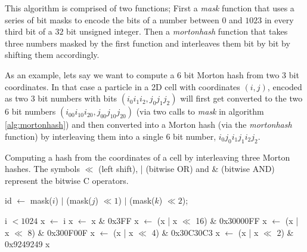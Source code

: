 \documentclass[ twoside,openright,titlepage,numbers=noenddot,%
headinclude,footinclude,cleardoublepage=empty,abstract=on,
BCOR=5mm,paper=a4,fontsize=11pt, dvipsnames
]{scrreprt}
\begin{document}
This algorithm is comprised of two functions; First a \emph{mask} function that uses a series of bit masks to encode the bits of a number between $0$ and $1023$ in every third bit of a $32$ bit unsigned integer. Then a \emph{mortonhash} function that takes three numbers masked by the first function and interleaves them bit by bit by shifting them accordingly.

As an example, lets say we want to compute a $6$ bit Morton hash from two $3$ bit coordinates. In that case a particle in a 2D cell with coordinates $(i,j)$, encoded as two $3$ bit numbers with bits $(i_0i_1i_2, j_0j_1j_2)$ will first get converted to the two $6$ bit numbers $(i_00i_10i_20, j_00j_10j_20)$ (via two calls to \emph{mask} in algorithm \ref{alg:mortonhash}) and then converted into a Morton hash (via the \emph{mortonhash} function) by interleaving them into a single $6$ bit number, $i_0j_0i_1j_1i_2j_2$.

\begin{algorithm}
  \caption{Computing a hash from the coordinates of a cell by interleaving three Morton hashes. The symbols $\ll$ (left shift), | (bitwise OR) and \& (bitwise AND) represent the bitwise C operators. } \label{alg:mortonhash}
  \begin{algorithmic}[1]
    
    \State \Return id $\gets$ mask($i$) $|$ (mask($j$)  $\ll 1$) $|$ (mask($k$) $\ll 2$);
    \EndFunction

    \Ensure i $< 1024$
    \State x $\gets$ i     
    \State x $\gets$ x \& 0x3FF
    \State x $\gets$ (x | x $\ll$  16) \& 0x30000FF
    \State x $\gets$ (x | x $\ll$  8)  \& 0x300F00F
    \State x $\gets$ (x | x $\ll$  4)  \& 0x30C30C3
    \State x $\gets$ (x | x $\ll$  2)  \& 0x9249249
    \State \Return x
    \EndFunction

  \end{algorithmic}
\end{algorithm}
\end{document}
